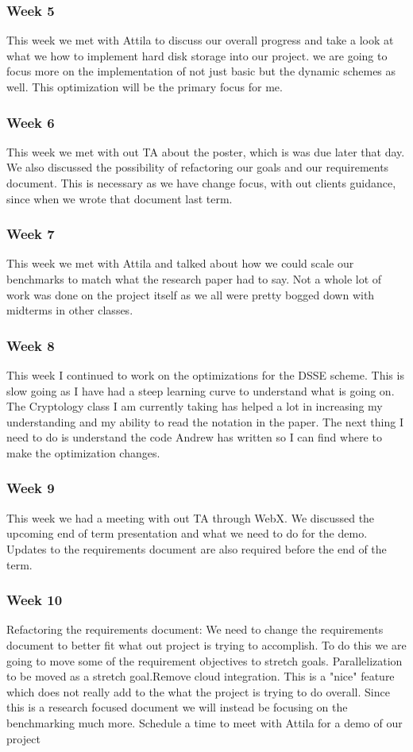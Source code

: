 \subsubsection{Week 5}
This week we met with Attila to discuss our overall progress and take a look at what we how to implement hard disk storage into our project. we are going to focus more on the implementation of not just basic but the dynamic schemes as well. This optimization will be the primary focus for me.
\subsubsection{Week 6}
This week we met with out TA about the poster, which is was due later that day. We also discussed the possibility of refactoring our goals and our requirements document. This is necessary as we have change focus, with out clients guidance, since when we wrote that document last term.
\subsubsection{Week 7}
This week we met with Attila and talked about how we could scale our benchmarks to match what the research paper had to say. Not a whole lot of work was done on the project itself as we all were pretty bogged down with midterms in other classes.
\subsubsection{Week 8}
This week I continued to work on the optimizations for the DSSE scheme. This is slow going as I have had a steep learning curve to understand what is going on. The Cryptology class I am currently taking has helped a lot in increasing my understanding and my ability to read the notation in the paper. The next thing I need to do is understand the code Andrew has written so I can find where to make the optimization changes.
\subsubsection{Week 9}
This week we had a meeting with out TA through WebX. We discussed the upcoming end of term presentation and what we need to do for the demo. Updates to the requirements document are also required before the end of the term.
\subsubsection{Week 10}
Refactoring the requirements document: We need to change the requirements document to better fit what out project is trying to accomplish. To do this we are going to move some of the requirement objectives to stretch goals. Parallelization to be moved as a stretch goal.Remove cloud integration. This is a "nice" feature which does not really add to the what the project is trying to do overall. Since this is a research focused document we will instead be focusing on the benchmarking much more. Schedule a time to meet with Attila for a demo of our project
